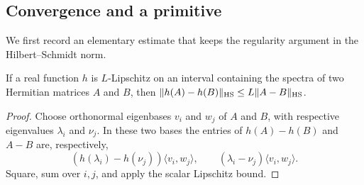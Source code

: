 \subsection{Convergence and a primitive}

We first record an elementary estimate that keeps the regularity argument
in the Hilbert--Schmidt norm.

\begin{lemma}\label{lem:HS-calculus}
If a real function $h$ is $L$-Lipschitz on an interval containing the spectra
of two Hermitian matrices $A$ and $B$, then
$\|h(A)-h(B)\|_{\mathrm{HS}}\le L\|A-B\|_{\mathrm{HS}}$.
\end{lemma}
\begin{proof}
Choose orthonormal eigenbases $v_i$ and $w_j$ of $A$ and $B$, with respective
eigenvalues $\lambda_i$ and $\nu_j$. In these two bases the entries of
$h(A)-h(B)$ and $A-B$ are, respectively,
\[
 (h(\lambda_i)-h(\nu_j))\langle v_i,w_j\rangle,
 \qquad (\lambda_i-\nu_j)\langle v_i,w_j\rangle.
\]
Square, sum over $i,j$, and apply the scalar Lipschitz bound.
\end{proof}

